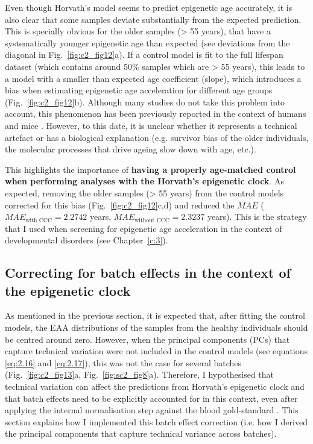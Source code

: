 \bigskip

Even though Horvath's model seems to predict epigenetic age accurately, it is also clear that some samples deviate substantially from the expected prediction. This is specially obvious for the older samples (> 55 years), that have a systematically younger epigenetic age than expected (see deviations from the diagonal in  Fig.~\ref{fig:c2_fig12}a). If a control model is fit to the full lifespan dataset (which contains around 50\% samples which are > 55 years), this leads to a model with a smaller than expected age coefficient (slope), which introduces a bias when estimating epigenetic age acceleration for different age groups (Fig.~\ref{fig:c2_fig12}b). Although many studies do not take this problem into account, this phenomenon has been previously reported in the context of humans \citep{ElKhoury2018,Marioni2018} and mice \citep{Stubbs2017}. However, to this date, it is unclear whether it represents a technical artefact or has a biological explanation (e.g. survivor bias of the older individuals, the molecular processes that drive ageing slow down with age, etc.). 

\bigskip

This highlights the importance of \textbf{having a properly age-matched control when performing analyses with the Horvath's epigenetic clock}. As expected, removing the older samples (> 55 years) from the control models corrected for this bias (Fig.~\ref{fig:c2_fig12}c,d) and reduced the $MAE$ ($MAE_{\text{with CCC}} = 2.2742$ years, $MAE_{\text{without CCC}} = 2.3237$ years). This is the strategy that I used when screening for epigenetic age acceleration in the context of developmental disorders (see Chapter~\ref{c:3}).

\smallskip

\subsection{Correcting for batch effects in the context of the epigenetic clock} \label{s:2.2.3}

\smallskip

As mentioned in the previous section, it is expected that, after fitting the control models, the EAA distributions of the samples from the healthy individuals should be centred around zero. However, when the principal components (\acrshort{PC}s) that capture technical variation were not included in the control models (see equations \ref{eq:2.16} and \ref{eq:2.17}), this was not the case for several batches (Fig.~\ref{fig:c2_fig13}a, Fig.~\ref{fig:sc2_fig8}a). Therefore, I hypothesised that technical variation can affect the predictions from Horvath's epigenetic clock and that batch effects need to be explicitly accounted for in this context, even after applying the internal normalisation step against the blood gold-standard \citep{Horvath2013}. This section explains how I implemented this batch effect correction (i.e. how I derived the principal components that capture technical variance across batches).

